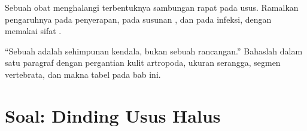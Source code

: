 \begin{exercise}[$\star\star\star$]\label{exo:b1:body-plans-tissues:11}
Sebuah obat menghalangi terbentuknya sambungan rapat pada  usus.
Ramalkan pengaruhnya pada penyerapan, pada susunan ,
dan pada infeksi, dengan memakai sifat .
\end{exercise}

\begin{exercise}[$\star\star\star$]\label{exo:b1:body-plans-tissues:12}
``Sebuah  adalah sehimpunan kendala, bukan sebuah rancangan.''
Bahaslah dalam satu paragraf dengan pergantian kulit artropoda, ukuran
serangga, segmen vertebrata, dan makna tabel pada bab ini.
\end{exercise}

\section{Soal: Dinding Usus Halus}

